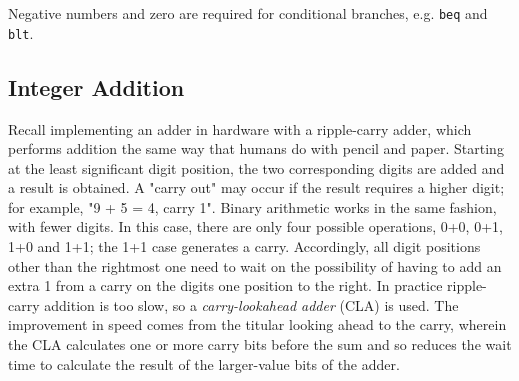 Negative numbers and zero are required
for conditional branches, e.g. \texttt{beq}
and \texttt{blt}.

\subsection{Integer Addition}

Recall implementing an adder in hardware with a ripple-carry
adder, which performs addition the same way that humans do
with pencil and paper. Starting at the least significant digit position,
the two corresponding digits are added and a result is obtained.
A "carry out" may occur if the result requires a higher digit;
for example, "9 + 5 = 4, carry 1". Binary arithmetic works in the same
fashion, with fewer digits. In this case, there are only four possible
operations, 0+0, 0+1, 1+0 and 1+1; the 1+1 case generates a carry.
Accordingly, all digit positions other than the rightmost one need to
wait on the possibility of having to add an extra 1 from a carry on the
digits one position to the right. In practice ripple-carry addition is
too slow, so a \emph{carry-lookahead adder} (CLA)
is used. The improvement in speed comes from the titular
looking ahead to the carry, wherein the CLA calculates one or more
carry bits before the sum and so reduces the wait time to calculate
the result of the larger-value bits of the adder.

